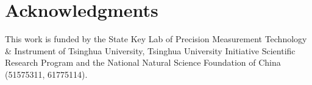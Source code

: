 \documentclass{osa-article}
\begin{document}
\section*{Acknowledgments}
This work is funded by the State Key Lab of Precision Measurement Technology \& Instrument of Tsinghua University, Tsinghua University Initiative Scientific Research Program and the National Natural Science Foundation of China (51575311, 61775114). 




\end{document}
